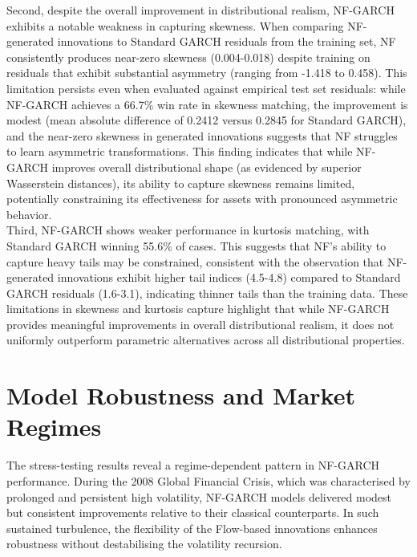 \documentclass[oneside,12pt]{CUEDthesisPSnPDF}
\begin{document}
Second, despite the overall improvement in distributional realism, NF-GARCH exhibits a notable weakness in capturing skewness. When comparing NF-generated innovations to Standard GARCH residuals from the training set, NF consistently produces near-zero skewness (0.004-0.018) despite training on residuals that exhibit substantial asymmetry (ranging from -1.418 to 0.458). This limitation persists even when evaluated against empirical test set residuals: while NF-GARCH achieves a 66.7\% win rate in skewness matching, the improvement is modest (mean absolute difference of 0.2412 versus 0.2845 for Standard GARCH), and the near-zero skewness in generated innovations suggests that NF struggles to learn asymmetric transformations. This finding indicates that while NF-GARCH improves overall distributional shape (as evidenced by superior Wasserstein distances), its ability to capture skewness remains limited, potentially constraining its effectiveness for assets with pronounced asymmetric behavior.\\

Third, NF-GARCH shows weaker performance in kurtosis matching, with Standard GARCH winning 55.6\% of cases. This suggests that NF's ability to capture heavy tails may be constrained, consistent with the observation that NF-generated innovations exhibit higher tail indices (4.5-4.8) compared to Standard GARCH residuals (1.6-3.1), indicating thinner tails than the training data. These limitations in skewness and kurtosis capture highlight that while NF-GARCH provides meaningful improvements in overall distributional realism, it does not uniformly outperform parametric alternatives across all distributional properties.\\

\section{Model Robustness and Market Regimes}

\noindent
The stress-testing results reveal a regime-dependent pattern in NF-GARCH performance. During the 2008 Global Financial Crisis, which was characterised by prolonged and persistent high volatility, NF-GARCH models delivered modest but consistent improvements relative to their classical counterparts. In such sustained turbulence, the flexibility of the Flow-based innovations enhances robustness without destabilising the volatility recursion.\\
\end{document}
